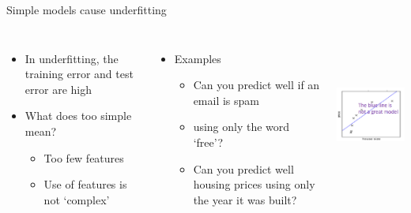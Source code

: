 \documentclass[aspectratio=169,14pt,usenames,dvipsnames]{beamer}
\begin{document}
\begin{frame}{Simple models cause underfitting}
\begin{columns}
\begin{itemize}
\item In underfitting, the training error and test error are high
\item What does too simple mean?
\begin{itemize}
\item Too few features
\item Use of features is not ‘complex’
\end{itemize}
\end{itemize}

\begin{itemize}
\item Examples
\begin{itemize}
\item Can you predict well if an email is spam 
\item using only the word ‘free’?
\item Can you predict well housing prices using only the year it was built?
\end{itemize}
\end{itemize}

\includegraphics[width=5.5cm, height=5cm]{Images/AIML_OFG_15.png}
\end{columns}
\end{frame}
\end{document}

